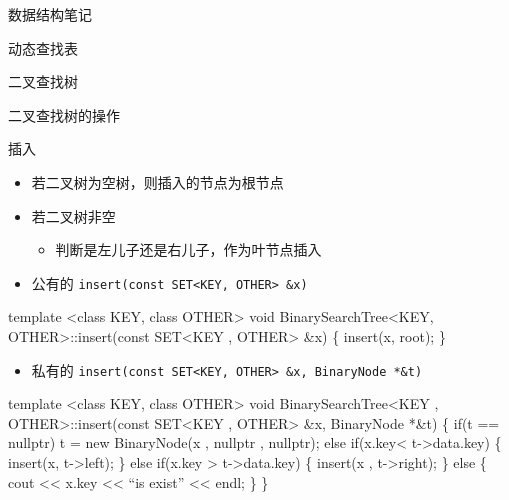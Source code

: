 \documentclass[
  ignorenonframetext,
]{beamer}
\newenvironment{Shaded}{}{}
\newcommand{\NormalTok}[1]{#1}
\providecommand{\tightlist}{%
  \setlength{\itemsep}{0pt}\setlength{\parskip}{0pt}}
\begin{document}
\begin{frame}[fragile]{数据结构笔记}
\begin{block}{动态查找表}
\begin{block}{二叉查找树}
\begin{block}{二叉查找树的操作}
\begin{block}{插入}
\protect{}\label{ux63d2ux5165}
\begin{itemize}
\item
  若二叉树为空树，则插入的节点为根节点
\item
  若二叉树非空

  \begin{itemize}
  \tightlist
  \item
    判断是左儿子还是右儿子，作为叶节点插入
  \end{itemize}
\item
  公有的
  \texttt{insert(const\ SET\textless{}KEY,\ OTHER\textgreater{}\ \&x)}
\end{itemize}

\begin{Shaded}
\begin{Highlighting}[]
\NormalTok{template \textless{}class KEY, class OTHER\textgreater{}}
\NormalTok{void BinarySearchTree\textless{}KEY, OTHER\textgreater{}::insert(const SET\textless{}KEY , OTHER\textgreater{} \&x)}
\NormalTok{\{}
\NormalTok{  insert(x, root);}
\NormalTok{\}}
\end{Highlighting}
\end{Shaded}

\begin{itemize}
\tightlist
\item
  私有的
  \texttt{insert(const\ SET\textless{}KEY,\ OTHER\textgreater{}\ \&x,\ BinaryNode\ *\&t)}
\end{itemize}

\begin{Shaded}
\begin{Highlighting}[]
\NormalTok{template \textless{}class KEY, class OTHER\textgreater{}}
\NormalTok{void BinarySearchTree\textless{}KEY , OTHER\textgreater{}::insert(const SET\textless{}KEY , OTHER\textgreater{} \&x, BinaryNode *\&t)}
\NormalTok{\{}
\NormalTok{  if(t == nullptr)}
\NormalTok{  t = new BinaryNode(x , nullptr , nullptr);}
\NormalTok{  else if(x.key\textless{} t{-}\textgreater{}data.key)}
\NormalTok{  \{}
\NormalTok{    insert(x, t{-}\textgreater{}left);}
\NormalTok{  \}}
\NormalTok{  else if(x.key \textgreater{} t{-}\textgreater{}data.key)}
\NormalTok{  \{}
\NormalTok{    insert(x , t{-}\textgreater{}right);}
\NormalTok{  \}}
\NormalTok{  else}
\NormalTok{  \{}
\NormalTok{    cout \textless{}\textless{} x.key \textless{}\textless{} “is exist” \textless{}\textless{} endl;}
\NormalTok{  \}}
\NormalTok{\}}
\end{Highlighting}
\end{Shaded}
\end{block}


\end{block}
\end{block}
\end{block}
\end{frame}
\end{document}
